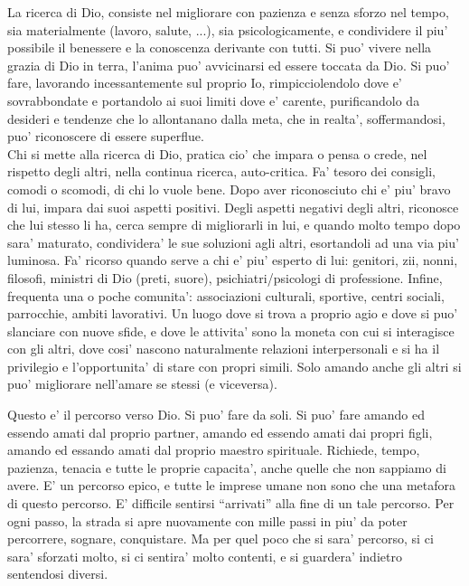 La ricerca di Dio, consiste nel migliorare con pazienza e senza sforzo nel tempo, sia materialmente (lavoro, salute, ...), sia psicologicamente, e condividere il piu' possibile il benessere e la conoscenza derivante con tutti. Si puo' vivere nella grazia di Dio in terra, l'anima puo' avvicinarsi ed essere toccata da Dio.
Si puo' fare, lavorando incessantemente sul proprio Io, rimpicciolendolo dove e' sovrabbondate e portandolo ai suoi limiti dove e' carente, purificandolo da desideri e tendenze che lo allontanano dalla meta, che in realta', soffermandosi, puo' riconoscere di essere superflue. \\
Chi si mette alla ricerca di Dio, pratica cio' che impara o pensa o crede, nel rispetto degli altri, nella continua ricerca, auto-critica. Fa' tesoro dei consigli, comodi o scomodi, di chi lo vuole bene. Dopo aver riconosciuto chi e' piu' bravo di lui, impara dai suoi aspetti positivi. Degli aspetti negativi degli altri, riconosce che lui stesso li ha, cerca sempre di migliorarli in lui, e quando molto tempo dopo sara' maturato, condividera' le sue soluzioni agli altri, esortandoli ad una via piu' luminosa. 
Fa' ricorso quando serve a chi e' piu' esperto di lui: genitori, zii, nonni, filosofi, ministri di Dio (preti, suore), psichiatri/psicologi di professione.
Infine, frequenta una o poche comunita': associazioni culturali, sportive, centri sociali, parrocchie, ambiti lavorativi. Un luogo dove si trova a proprio agio e dove si puo' slanciare con nuove sfide, e dove le attivita' sono la moneta con cui si interagisce con gli altri, dove cosi' nascono naturalmente relazioni interpersonali e si ha il privilegio e l'opportunita' di stare con propri simili. Solo amando anche gli altri si puo' migliorare nell'amare se stessi (e viceversa).

Questo e' il percorso verso Dio. Si puo' fare da soli. Si puo' fare amando ed essendo amati dal proprio partner, amando ed essendo amati dai propri figli, amando ed essando amati dal proprio maestro spirituale. Richiede, tempo, pazienza, tenacia e tutte le proprie capacita', anche quelle che non sappiamo di avere. E' un percorso epico, e tutte le imprese umane non sono che una metafora di questo percorso.
E' difficile sentirsi ``arrivati'' alla fine di un tale percorso. Per ogni passo, la strada si apre nuovamente con mille passi in piu' da poter percorrere, sognare, conquistare. Ma per quel poco che si sara' percorso, si ci sara' sforzati molto, si ci sentira' molto contenti, e si guardera' indietro sentendosi diversi.


